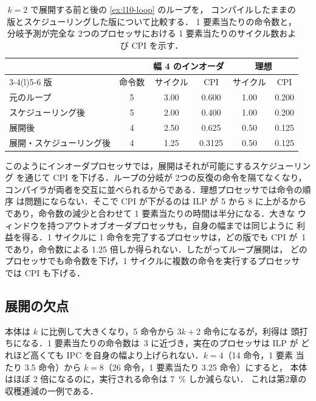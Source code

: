 \documentclass[../main.tex]{subfiles}
\begin{document}
\begin{table}[htbp]
  \centering\small
  \caption{$k=2$ で展開する前と後の \cref{ex:l10-loop} のループを，
    コンパイルしたままの版とスケジューリングした版について比較する．
    1 要素当たりの命令数と，分岐予測が完全な 2つのプロセッサにおける
    1 要素当たりのサイクル数および CPI を示す．}
  \label{tab:l10-unrolling}
  \begin{tabular}{@{}lccccc@{}}
    \toprule
    & & \multicolumn{2}{c}{幅 4 のインオーダ} & \multicolumn{2}{c}{理想} \\
    \cmidrule(lr){3-4}\cmidrule(l){5-6}
    版 & 命令数 & サイクル & CPI & サイクル & CPI \\
    \midrule
    元のループ               & 5 & 3.00 & 0.600  & 1.00 & 0.200 \\
    スケジューリング後       & 5 & 2.00 & 0.400  & 1.00 & 0.200 \\
    展開後                   & 4 & 2.50 & 0.625  & 0.50 & 0.125 \\
    展開・スケジューリング後 & 4 & 1.25 & 0.3125 & 0.50 & 0.125 \\
    \bottomrule
  \end{tabular}
\end{table}

このようにインオーダプロセッサでは，展開はそれが可能にするスケジューリング
を通じて CPI を下げる．ループの分岐が 2つの反復の命令を隔てなくなり，
コンパイラが両者を交互に並べられるからである．理想プロセッサでは命令の順序
は問題にならない．そこで CPI が下がるのは ILP が 5 から 8 に上がるから
であり，命令数の減少と合わせて 1 要素当たりの時間は半分になる．大きな
ウィンドウを持つアウトオブオーダプロセッサも，自身の幅までは同じように
利益を得る．1 サイクルに 1 命令を完了するプロセッサは，どの版でも CPI が~1
であり，命令数による 1.25 倍しか得られない．したがってループ展開は，
どのプロセッサでも命令数を下げ，1 サイクルに複数の命令を実行するプロセッサ
では CPI も下げる．

\subsection{展開の欠点}
\label{sec:l10-bloat}

本体は $k$ に比例して大きくなり，5 命令から $3k+2$ 命令になるが，利得は
頭打ちになる．1 要素当たりの命令数は~3 に近づき，実在のプロセッサは ILP が
どれほど高くても IPC を自身の幅より上げられない．$k=4$（14 命令，1 要素
当たり 3.5 命令）から $k=8$（26 命令，1 要素当たり 3.25 命令）にすると，
本体はほぼ 2 倍になるのに，実行される命令は \SI{7}{\percent} しか減らない．
これは第2章の収穫逓減の一例である．
\end{document}
